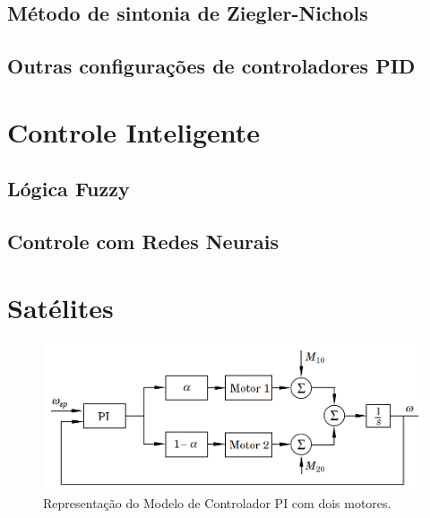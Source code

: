 \subsection{Método de sintonia de Ziegler-Nichols}

\subsection{Outras configurações de controladores PID}

\section{Controle Inteligente}

\subsection{Lógica Fuzzy}

\subsection{Controle com Redes Neurais}  %

\section{Satélites}

\begin{figure}[htb]
  \caption{Representação do Modelo de Controlador PI com dois motores.}
  \begin{center}
      \includegraphics[scale=0.65]{img/pi_twomotors_astrom_p308}
  \end{center}
  \label{fig:pi_twomotors_astrom_p308}
\end{figure}

